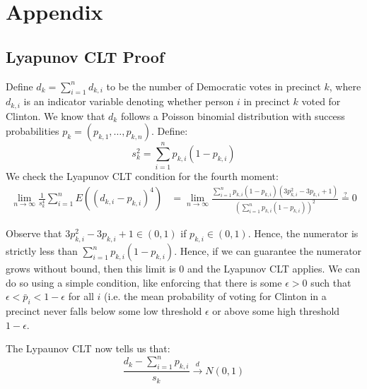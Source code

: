 \documentclass[10pt, letterpaper]{article}
\begin{document}
\section{Appendix}
\subsection{Lyapunov CLT Proof}

Define $d_k = \sum_{i = 1}^n d_{k, i}$ to be the number of Democratic votes in precinct $k$, where $d_{k, i}$ is an indicator variable denoting whether person $i$ in precinct $k$ voted for Clinton. We know that $d_k$ follows a Poisson binomial distribution with success probabilities $p_k = (p_{k, 1}, \dots, p_{k, n})$. Define:
\[ s_{k}^2 = \sum_{i = 1}^{n} p_{k, i} (1-p_{k, i}) \] 
We check the Lyapunov CLT condition for the fourth moment: 
\begin{align*}
\lim_{n \to \infty} \frac{1}{s_k^4} \sum_{i = 1}^n E \left( (d_{k, i} - p_{k, i})^4 \right) &= \lim_{n \to \infty} \frac{\sum_{i = 1}^n p_{k, i}(1-p_{k, i}) \left( 3p_{k, i}^2 - 3p_{k, i} + 1 \right)}{\left(\sum_{i = 1}^n p_{k, i} \left( 1- p_{k, i} \right) \right)^2} \stackrel{?} = 0 
\end{align*}

Observe that $3p_{k, i}^2 - 3p_{k, i} + 1 \in (0, 1)$ if $p_{k, i} \in (0, 1)$. Hence, the numerator is strictly less than $\sum_{i = 1}^n p_{k, i} (1 - p_{k, i})$. Hence, if we can guarantee the numerator grows without bound, then this limit is 0 and the Lyapunov CLT applies. We can do so using a simple condition, like enforcing that there is some $\epsilon > 0$ such that $\epsilon < \bar p_i < 1- \epsilon$ for all $i$ (i.e. the mean probability of voting for Clinton in a precinct never falls below some low threshold $\epsilon$ or above some high threshold $1-\epsilon$. 

The Lypaunov CLT now tells us that: 
\[ \frac{d_k - \sum_{i = 1}^{n} p_{k, i} }{s_k} \stackrel{d} \longrightarrow N(0, 1) \] 

{\small


}
\end{document}
